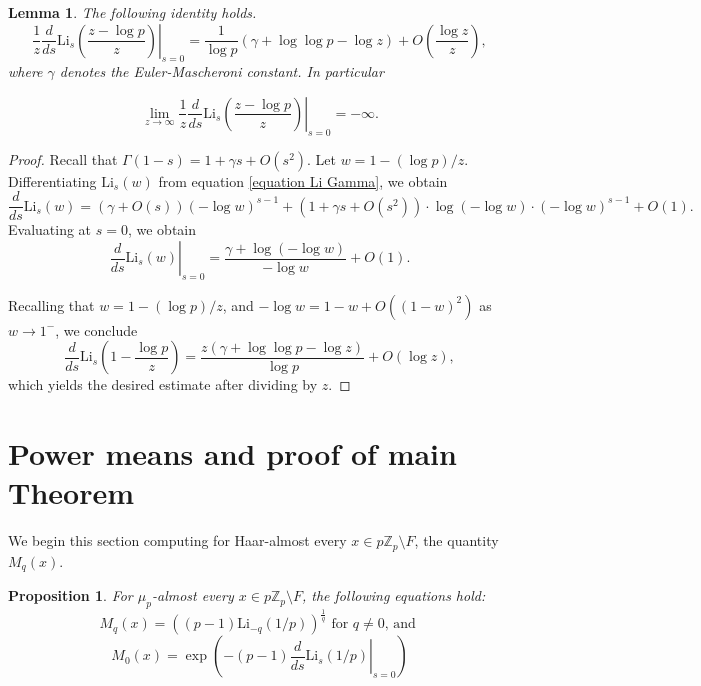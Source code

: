 \documentclass[11pt]{amsart}
\newtheorem{lemma}[theorem]{Lemma}
\newtheorem{proposition}[theorem]{Proposition}
\theoremstyle{remark}
\numberwithin{equation}{section}
\newcommand{\Z}{\mathbb{Z}}
\newcommand{\Zp}{\mathbb{Z}_p}
\newcommand{\Li}{\mathrm{Li}}
\begin{document}
\begin{lemma}\label{lemma derivada en s} The following identity holds.
      \[\dfrac{1}{z}\left.\dfrac{d}{ds}\Li_s\left(\dfrac{z-\log p}{z} \right)\right|_{s=0}=\dfrac{1}{\log p}\left( \gamma +\log \log p-\log z \right)+O\left( \dfrac{\log z}{z}\right),\]
      where $\gamma$ denotes the Euler-Mascheroni constant. In particular

\[\lim_{z\to \infty}\dfrac{1}{z}\left.\dfrac{d}{ds}\Li_s\left(\dfrac{z-\log p}{z} \right)\right|_{s=0}=-\infty.\]
\end{lemma}

\begin{proof}
Recall that $\Gamma(1-s)=1+\gamma s+O(s^2)$. Let $w=1-(\log p) /z$. Differentiating $\Li_s(w)$ from equation \eqref{equation Li Gamma}, we obtain
\[\dfrac{d}{ds}\Li_s(w)=(\gamma +O(s))(-\log w)^{s-1}+(1+\gamma s+O(s^2))\cdot \log (-\log w)\cdot (-\log w)^{s-1}+O(1).\]
Evaluating at $s=0$, we obtain
\[\left. \dfrac{d}{ds}\Li_s(w)\right|_{s=0}=\dfrac{\gamma+\log(-\log w)}{-\log w}+O(1).\]

Recalling that $w=1-(\log p)/z$, and $-\log w=1-w+O((1-w)^2)$ as $w\to 1^{-}$, we conclude 
\[\dfrac{d}{ds}\Li_s\left(1-\dfrac{\log p}{z} \right)=\dfrac{z(\gamma+\log \log p-\log z)}{\log p}+O(\log z),\]
which yields the desired estimate after dividing by 
$z$.

\end{proof}

\section{Power means and proof of main Theorem}\label{sectionproof}


We begin this section computing for Haar-almost every $x\in p\Z_p\setminus F$, the quantity $M_q(x)$.

\begin{proposition}\label{PropCalculosHar}
For $\mu_p$-almost every $x\in p\Zp\setminus F$, the following equations hold:
    \begin{equation}\label{Kqctp}
    M_{q}(x)=\left((p-1)\Li_{-q}(1/p)\right)^{\frac{1}{q}} \text{  for $q\neq 0$, and }
    \end{equation} %
    \begin{equation}\label{K0ctp}
    M_{0}(x)=\exp\left(-(p-1)\left.\dfrac{d}{ds}\Li_s(1/p)\right|_{s=0}\right)
    \end{equation}
\end{proposition}
\end{document}
